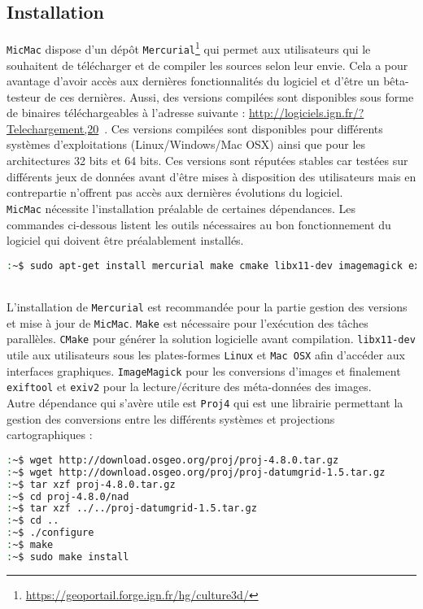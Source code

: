 \documentclass[a4paper,10pt]{article} %
\begin{document}
\subsection{Installation}
{\tt MicMac} dispose d'un dépôt {\tt Mercurial}\footnote{\url{https://geoportail.forge.ign.fr/hg/culture3d/}} qui permet aux utilisateurs qui le souhaitent de télécharger et de compiler les sources selon leur envie. Cela a pour avantage d'avoir accès aux dernières fonctionnalités du logiciel et d'être un bêta-testeur de ces dernières. Aussi, des versions compilées sont disponibles sous forme de binaires téléchargeables à l'adresse suivante : \url{http://logiciels.ign.fr/?Telechargement,20}\ . Ces versions compilées sont disponibles pour différents systèmes d'exploitations (Linux/Windows/Mac OSX) ainsi que pour les architectures 32 bits et 64 bits. Ces versions sont réputées stables car testées sur différents jeux de données avant d'être mises à disposition des utilisateurs mais en contrepartie n'offrent pas accès aux dernières évolutions du logiciel.\newline
\\
{\tt MicMac} nécessite l'installation préalable de certaines dépendances. Les commandes ci-dessous listent les outils nécessaires au bon fonctionnement du logiciel qui doivent être préalablement installés.
\begin{lstlisting}[language=bash]
:~$ sudo apt-get install mercurial make cmake libx11-dev imagemagick exiftool exiv2
\end{lstlisting}
~\\
L'installation de {\tt Mercurial} est recommandée pour la partie gestion des versions et mise à jour de {\tt MicMac}. {\tt Make} est nécessaire pour l’exécution des tâches parallèles. {\tt CMake} pour générer la solution logicielle avant compilation. {\tt libx11-dev} utile aux utilisateurs sous les plates-formes {\tt Linux} et {\tt Mac OSX} afin d'accéder aux interfaces graphiques. {\tt ImageMagick} pour les conversions d'images et finalement {\tt exiftool} et {\tt exiv2} pour la lecture/écriture des méta-données des images.\newline
\\
Autre dépendance qui s'avère utile est {\tt Proj4} qui est une librairie permettant la gestion des conversions entre les différents systèmes et projections cartographiques :
\begin{lstlisting}[language=bash]
:~$ wget http://download.osgeo.org/proj/proj-4.8.0.tar.gz
:~$ wget http://download.osgeo.org/proj/proj-datumgrid-1.5.tar.gz
:~$ tar xzf proj-4.8.0.tar.gz
:~$ cd proj-4.8.0/nad
:~$ tar xzf ../../proj-datumgrid-1.5.tar.gz
:~$ cd ..
:~$ ./configure
:~$ make
:~$ sudo make install
\end{lstlisting}
\end{document}
